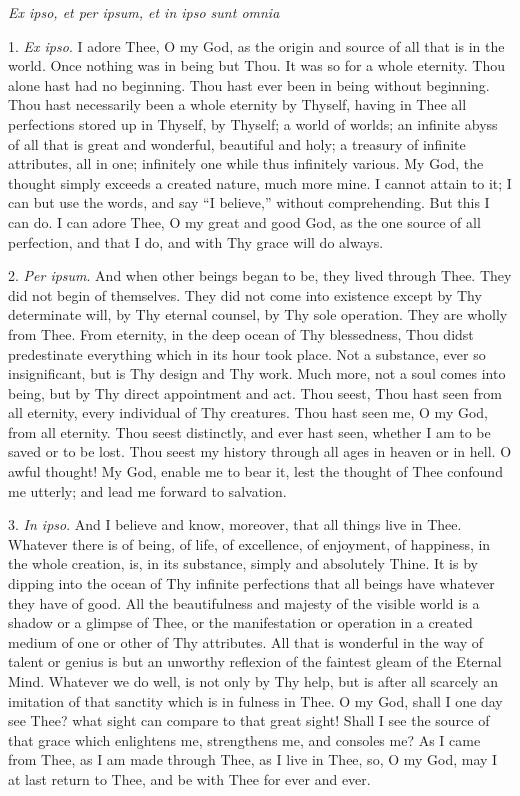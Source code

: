 
\emph{Ex
ipso, et per ipsum, et in ipso sunt omnia}

1. \emph{Ex ipso}. I adore Thee,
O my God, as the origin and source of all that is in the world. Once
nothing was in being but Thou. It was so for a whole eternity. Thou
alone hast had no beginning. Thou hast ever been in being without
beginning. Thou hast necessarily been a whole eternity by Thyself,
having in Thee all perfections stored up in Thyself, by Thyself; a world
of worlds; an infinite abyss of all that is great and wonderful,
beautiful and holy; a treasury of infinite attributes, all in one;
infinitely one while thus infinitely various. My God, the thought simply
exceeds a created nature, much more mine. I cannot attain to it; I can
but use the words, and say ``I believe,'' without comprehending. But this
I can do. I can adore Thee, O my great and good God, as the one source
of all perfection, and that I do, and with Thy grace will do always.

2. \emph{Per ipsum}. And when
other beings began to be, they lived through Thee. They did not begin of
themselves. They did not come into existence except by Thy
determinate will, by Thy eternal counsel, by Thy sole operation. They
are wholly from Thee. From eternity, in the deep ocean of Thy
blessedness, Thou didst predestinate everything which in its hour took
place. Not a substance, ever so insignificant, but is Thy design and Thy
work. Much more, not a soul comes into being, but by Thy direct
appointment and act. Thou seest, Thou hast seen from all eternity, every
individual of Thy creatures. Thou hast seen me, O my God, from all
eternity. Thou seest distinctly, and ever hast seen, whether I am to be
saved or to be lost. Thou seest my history through all ages in heaven or
in hell. O awful thought! My God, enable me to bear it, lest the thought
of Thee confound me utterly; and lead me forward to salvation.

3. \emph{In ipso}. And I believe
and know, moreover, that all things live in Thee. Whatever there is of
being, of life, of excellence, of enjoyment, of happiness, in the whole
creation, is, in its substance, simply and absolutely Thine. It is by
dipping into the ocean of Thy infinite perfections that all beings have
whatever they have of good. All the beautifulness and majesty of the
visible world is a shadow or a glimpse of Thee, or the manifestation or
operation in a created medium of one or other of Thy attributes. All
that is wonderful in the way of talent or genius is but an unworthy
reflexion of the faintest gleam of the Eternal Mind. Whatever we do
well, is not only by Thy help, but is after all scarcely an imitation of
that sanctity which is in fulness in Thee. O my God, shall I one day see
Thee? what sight can compare to that great sight! Shall I see the
source of that grace which enlightens me, strengthens me, and consoles
me? As I came from Thee, as I am made through Thee, as I live in Thee,
so, O my God, may I at last return to Thee, and be with Thee for ever
and ever.

